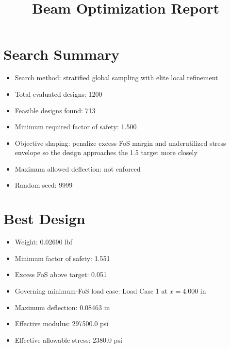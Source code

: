 \documentclass[11pt]{article}
\title{Beam Optimization Report}
\date{}
\begin{document}
\maketitle

\section*{Search Summary}
\begin{itemize}
\item Search method: stratified global sampling with elite local refinement
\item Total evaluated designs: 1200
\item Feasible designs found: 713
\item Minimum required factor of safety: 1.500
\item Objective shaping: penalize excess FoS margin and underutilized stress envelope so the design approaches the 1.5 target more closely
\item Maximum allowed deflection: not enforced
\item Random seed: 9999
\end{itemize}

\section*{Best Design}
\begin{itemize}
\item Weight: 0.02690 lbf
\item Minimum factor of safety: 1.551
\item Excess FoS above target: 0.051
\item Governing minimum-FoS load case: Load Case 1 at $x=4.000$ in
\item Maximum deflection: 0.08463 in
\item Effective modulus: 297500.0 psi
\item Effective allowable stress: 2380.0 psi
\end{itemize}
\end{document}
